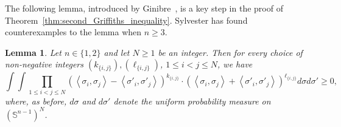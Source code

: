 \documentclass[12pt,reqno]{article}
\renewcommand{\S}{\mathbb{S}}
\newtheorem{lemma}[theorem]{Lemma}
\begin{document}
The following lemma, introduced by Ginibre~\cite{Gin70}, is a key step in the proof of Theorem~\ref{thm:second_Griffiths_inequality}. Sylvester \cite{Syl80} has found counterexamples to the lemma when $n\ge 3$.
\begin{lemma}\label{lem:Ginibre_inequality}
Let $n\in\{1,2\}$ and let $N\ge 1$ be an integer. Then for every choice of non-negative integers $(k_{\{i,j\}}), (\ell_{\{i,j\}})$, $1\le i<j\le N$, we have
\begin{equation}\label{eq:Ginibre_inequality}
   \int\int \prod_{1\le i<j\le N} (\left\langle\sigma_i,\sigma_j\right\rangle - \left\langle\sigma'_i,\sigma'_j\right\rangle)^{k_{\{i,j\}}}\cdot (\left\langle\sigma_i,\sigma_j\right\rangle + \left\langle\sigma'_i,\sigma'_j\right\rangle)^{\ell_{\{i,j\}}} d\sigma d\sigma' \ge 0,
\end{equation}
where, as before, $d\sigma$ and $d\sigma'$ denote the uniform probability measure on $(\S^{n-1})^{N}$.
\end{lemma}
\end{document}
